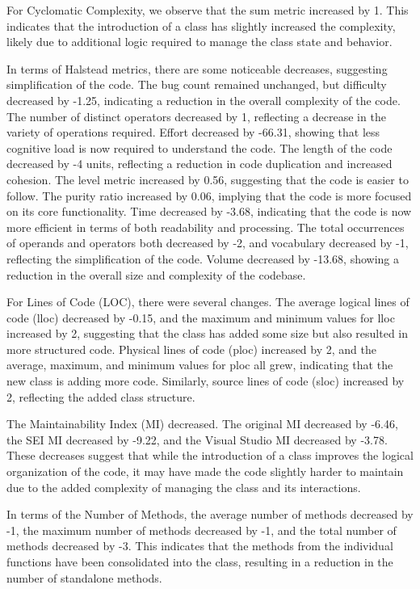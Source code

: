 For Cyclomatic Complexity, we observe that the sum metric increased by 1. This indicates that the introduction of a class has slightly increased the complexity, likely due to additional logic required to manage the class state and behavior.

In terms of Halstead metrics, there are some noticeable decreases, suggesting simplification of the code. The bug count remained unchanged, but difficulty decreased by -1.25, indicating a reduction in the overall complexity of the code. The number of distinct operators decreased by 1, reflecting a decrease in the variety of operations required. Effort decreased by -66.31, showing that less cognitive load is now required to understand the code. The length of the code decreased by -4 units, reflecting a reduction in code duplication and increased cohesion. The level metric increased by 0.56, suggesting that the code is easier to follow. The purity ratio increased by 0.06, implying that the code is more focused on its core functionality. Time decreased by -3.68, indicating that the code is now more efficient in terms of both readability and processing. The total occurrences of operands and operators both decreased by -2, and vocabulary decreased by -1, reflecting the simplification of the code. Volume decreased by -13.68, showing a reduction in the overall size and complexity of the codebase.

For Lines of Code (LOC), there were several changes. The average logical lines of code (lloc) decreased by -0.15, and the maximum and minimum values for lloc increased by 2, suggesting that the class has added some size but also resulted in more structured code. Physical lines of code (ploc) increased by 2, and the average, maximum, and minimum values for ploc all grew, indicating that the new class is adding more code. Similarly, source lines of code (sloc) increased by 2, reflecting the added class structure.

The Maintainability Index (MI) decreased. The original MI decreased by -6.46, the SEI MI decreased by -9.22, and the Visual Studio MI decreased by -3.78. These decreases suggest that while the introduction of a class improves the logical organization of the code, it may have made the code slightly harder to maintain due to the added complexity of managing the class and its interactions.

In terms of the Number of Methods, the average number of methods decreased by -1, the maximum number of methods decreased by -1, and the total number of methods decreased by -3. This indicates that the methods from the individual functions have been consolidated into the class, resulting in a reduction in the number of standalone methods.

